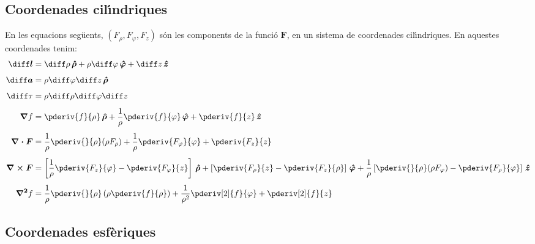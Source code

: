 \documentclass[catalan,a4paper,twoside,11pt]{article}
\begin{document}
\subsection{Coordenades cil\'{\i}ndriques}

\renewcommand{\va}{\ensuremath{\,\boldsymbol{\hat{\rho}}}}
\renewcommand{\vb}{\ensuremath{\,\boldsymbol{\hat{\varphi}}}}
\renewcommand{\vc}{\ensuremath{\,\boldsymbol{\hat{z}}}}
En les equacions seg\"{u}ents, $(F_\rho,F_\varphi,F_z)$  s\'{o}n les
components de la funci\'{o}  $\boldsymbol{F}$, en un sistema de
coordenades cil\'{\i}ndriques. En aquestes coordenades tenim:
\begin{align}
    \boldsymbol{\diff l} &= \diff \rho \va + \rho\diff \varphi \vb + \diff z \vc\\[1ex]
    \boldsymbol{\diff a} &= \rho\diff \varphi \diff z \va\\[1ex]
    \diff\tau &= \rho \diff \rho \diff \varphi \diff z\\[1ex]
    \boldsymbol{\nabla}f &= \pderiv{f}{\rho}\va + \frac{1}{\rho}\pderiv{f}{\varphi}\vb
    + \pderiv{f}{z}\vc\\[1ex]
    \boldsymbol{\nabla\cdot F} &= \frac{1}{\rho}\pderiv{}{\rho}(\rho F_\rho) +
    \frac{1}{\rho}\pderiv{F_\varphi}{\varphi}+ \pderiv{F_z}{z}\\[1ex]
    \boldsymbol{\nabla\times F} &= \left[\frac{1}{\rho}\pderiv{F_z}{\varphi}-
    \pderiv{F_\varphi}{z}\right]\va +
    \left[\pderiv{F_\rho}{z}-\pderiv{F_z}{\rho}\right]\vb +
    \frac{1}{\rho}\left[\pderiv{}{\rho}(\rho F_\varphi)-\pderiv{F_\rho}{\varphi}\right]\vc\\[1ex]
    \boldsymbol{\nabla^2}f &= \frac{1}{\rho}\pderiv{}{\rho}\left(\rho\pderiv{f}{\rho}
    \right)
    + \frac{1}{\rho^2}\pderiv[2]{f}{\varphi}+ \pderiv[2]{f}{z}
\end{align}


\subsection{Coordenades esf\`{e}riques}
\end{document}
